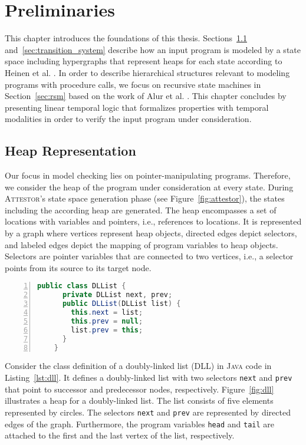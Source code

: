 \documentclass[a4paper, 12pt, twoside]{report}
\begin{document}
	\chapter{Preliminaries}\label{chp:preliminaries}
	
	This chapter introduces the foundations of this thesis. Sections~\ref{sec:heap} and~\ref{sec:transition_system} describe how an input program is modeled by a state space including hypergraphs that represent heaps for each state according to Heinen et al. \cite{heinen2015juggrnaut}. In order to describe hierarchical structures relevant to modeling programs with procedure calls, we focus on recursive state machines in Section~\ref{sec:rsm} based on the work of Alur et al. \cite{alur2001analysis}. This chapter concludes by presenting linear temporal logic that formalizes properties with temporal modalities in order to verify the input program under consideration.
	
	\section{Heap Representation}\label{sec:heap}	
	
	Our focus in model checking lies on pointer-manipulating programs. Therefore, we consider the heap of the program under consideration at every state. During \textsc{Attestor}'s state space generation phase (see Figure~\ref{fig:attestor}), the states including the according heap are generated. The heap encompasses a set of locations with variables and pointers, i.e., references to locations. It is represented by a graph where vertices represent heap objects, directed edges depict selectors, and labeled edges depict the mapping of program variables to heap objects. Selectors are pointer variables that are connected to two vertices, i.e., a selector points from its source to its target node.
	
	\begin{lstlisting}[language=Java,numbers=left,
	stepnumber=1,keywordstyle=\color{blue},frame=single,caption={\textsc{Java} class definition for doubly-linked lists.},captionpos=b,label={lst:dll}]
	public class DLList {	
	  private DLList next, prev;	  	
	  public DLList(DLList list) {	
	    this.next = list;
	    this.prev = null;
	    list.prev = this;
	  }
	}
	\end{lstlisting}
	
	Consider the class definition of a doubly-linked list (DLL) in \textsc{Java} code in Listing~\ref{lst:dll}. It defines a doubly-linked list with two selectors \texttt{next} and \texttt{prev} that point to successor and predecessor nodes, respectively.
	Figure~\ref{fig:dll} illustrates a heap for a doubly-linked list. The list consists of five elements represented by circles. The selectors \texttt{next} and \texttt{prev} are represented by directed edges of the graph. Furthermore, the program variables \texttt{head} and \texttt{tail} are attached to the first and the last vertex of the list, respectively.\\			
\end{document}
